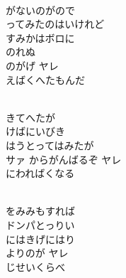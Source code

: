 \documentclass[10pt,b5j]{tarticle} %
\begin{document}
\vspace{1.5em} %
\newcommand{\linespace}{0.5em} %
\newcommand{\blocksize}{0.5\hsize} %
\newcommand{\itemmargin}{3em} %
\begin{enumerate} %
    \setlength{\itemindent}{\itemmargin} %
    \begin{minipage}[c]{\blocksize}
    
        \vspace{\linespace}
        \item~\\
        がないのがので\\
        ってみたのはいけれど\\
        すみかはボロに\\
        のれぬ\\
        のがげ ヤレ\\
        えばくへたもんだ
        
    \end{minipage}
    \begin{minipage}[c]{\blocksize}
        
        \vspace{\linespace}
        \item~\\
        きてへたが\\
        けばにいびき\\
        はうとってはみたが\\
        サァ からがんばるぞ ヤレ\\
        にわればくなる
        
    \end{minipage}
    \begin{minipage}[c]{\blocksize}
        
        \vspace{\linespace}
        \item~\\
        をみみもすれば\\
        ドンパとっりい\\
        にはきげにはり\\
        よりのが ヤレ\\
        じせいくらべ
        

\end{minipage}
\end{enumerate}
\end{document}
